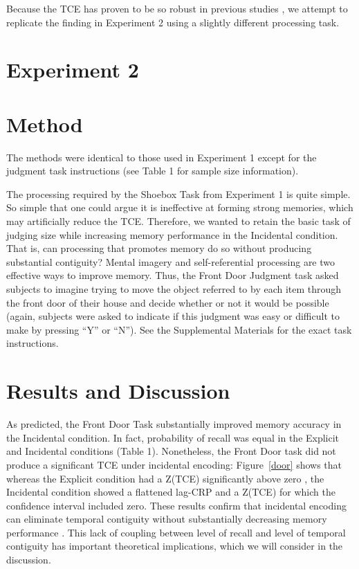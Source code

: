 \documentclass[jou,natbib,floatsintext]{apa6} %
\begin{document}
\color{black}




Because the TCE has proven to be so robust in previous studies \citep{HealKaha17}, we attempt to replicate the finding in Experiment 2 using a slightly different processing task.

\section{Experiment 2}
\section{Method}

The methods were identical to those used in Experiment 1 except for the judgment task instructions (see Table 1 for sample size information).

The processing required by the Shoebox Task from Experiment 1 is quite simple. So simple that one could argue it is  ineffective at forming strong memories, which may artificially reduce the TCE. Therefore, we wanted to retain the basic task of judging size while increasing memory performance in the Incidental condition. That is, can processing that promotes memory do so without producing substantial contiguity? Mental imagery and self-referential processing are two effective ways to improve memory. Thus, the Front Door Judgment task asked subjects to imagine trying to move the object referred to by each item through the front door of their house and decide whether or not it would be possible (again, subjects were asked to indicate if this judgment was easy or difficult to make by pressing ``Y'' or ``N''). See the Supplemental Materials for the exact task instructions.

\section{Results and Discussion}
As predicted, the Front Door Task substantially improved memory accuracy in the Incidental condition. In fact, probability of recall was equal in the Explicit and Incidental conditions (Table 1). Nonetheless, the Front Door task did not produce a significant TCE under incidental encoding: Figure~\ref{door} shows that whereas the Explicit condition \color{red} had a \label{done-11} Z(TCE) significantly above zero \color{black}, the Incidental condition showed a flattened lag-CRP and a Z(TCE) for which the confidence interval included zero. These results confirm that incidental encoding can eliminate temporal contiguity without substantially decreasing memory performance \citep{NairEtal17}. This lack of coupling between level of recall and level of temporal contiguity has important theoretical implications, which we will consider in the discussion.
\end{document}
